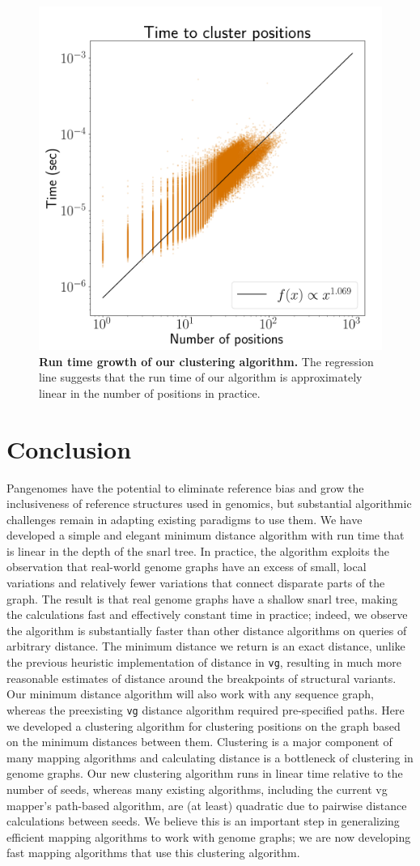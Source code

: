 \documentclass[11pt]{ucscthesis}
\begin{document}
\begin{figure}[H]
    \centering
    \includegraphics[width=0.5\columnwidth]{aim1_cluster_times.png}
    \caption[Run time growth of clustering algorithm]{\textbf{Run time growth of our clustering algorithm.} The regression line suggests that the run time of our algorithm is approximately linear in the number of positions in practice.}
    \label{fig:aim1_cluster_times}
\end{figure}

\section{Conclusion}
Pangenomes have the potential to eliminate reference bias and grow the inclusiveness of reference structures used in genomics, but substantial algorithmic challenges remain in adapting existing paradigms to use them.
We have developed a simple and elegant minimum distance algorithm with run time that is linear in the depth of the snarl tree.
In practice, the algorithm exploits the observation that real-world genome graphs have an excess of small, local variations and relatively fewer variations that connect disparate parts of the graph.
The result is that real genome graphs have a shallow snarl tree, making the calculations fast and effectively constant time in practice; indeed, we observe the algorithm is substantially faster than other distance algorithms on queries of arbitrary distance.
The minimum distance we return is an exact distance, unlike the previous heuristic implementation of distance in \texttt{vg}, resulting in much more reasonable estimates of distance around the breakpoints of structural variants.
Our minimum distance algorithm will also work with any sequence graph, whereas the preexisting \texttt{vg} distance algorithm required pre-specified paths.
Here we developed a clustering algorithm for clustering positions on the graph based on the minimum distances between them.
Clustering is a major component of many mapping algorithms and calculating distance is a bottleneck of clustering in genome graphs.
Our new clustering algorithm runs in linear time relative to the number of seeds, whereas many existing algorithms, including the current vg mapper’s path-based algorithm, are (at least) quadratic due to pairwise distance calculations between seeds.
We believe this is an important step in generalizing efficient mapping algorithms to work with genome graphs; we are now developing fast mapping algorithms that use this clustering algorithm.
\end{document}
